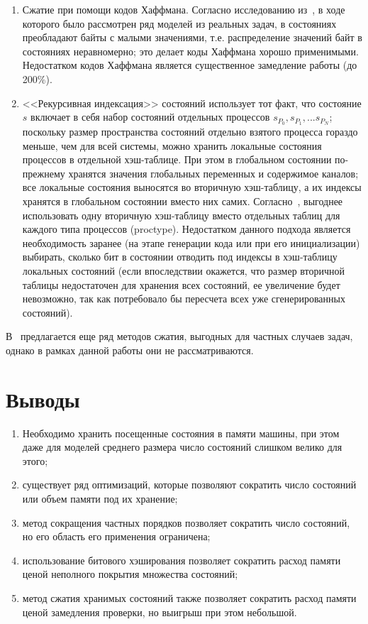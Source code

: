 \begin{enumerate}
\item Сжатие при помощи кодов Хаффмана. Согласно исследованию из~\cite{StateCompr}, в ходе
  которого было рассмотрен ряд моделей из реальных задач, в состояниях преобладают байты с
  малыми значениями, т.е. распределение значений байт в состояниях неравномерно; это
  делает коды Хаффмана хорошо применимыми. Недостатком кодов Хаффмана является
  существенное замедление работы (до 200\%).

\item <<Рекурсивная индексация>> состояний использует тот факт, что состояние $s$ включает
  в себя набор состояний отдельных процессов $s_{P_0}, s_{P_1}, ... s_{P_N}$; поскольку
  размер пространства состояний отдельно взятого процесса гораздо меньше, чем для всей
  системы, можно хранить локальные состояния процессов в отдельной хэш-таблице. При этом в
  глобальном состоянии по-прежнему хранятся значения глобальных переменных и содержимое
  каналов; все локальные состояния выносятся во вторичную хэш-таблицу, а их индексы
  хранятся в глобальном состоянии вместо них самих. Согласно~\cite{StateCompr}, выгоднее
  использовать одну вторичную хэш-таблицу вместо отдельных таблиц для каждого типа
  процессов (proctype). Недостатком данного подхода является необходимость заранее (на
  этапе генерации кода или при его инициализации) выбирать, сколько бит в состоянии
  отводить под индексы в хэш-таблицу локальных состояний (если впоследствии окажется, что
  размер вторичной таблицы недостаточен для хранения всех состояний, ее увеличение будет
  невозможно, так как потребовало бы пересчета всех уже сгенерированных состояний).
\end{enumerate}

В~\cite{StateCompr} предлагается еще ряд методов сжатия, выгодных для частных случаев
задач, однако в рамках данной работы они не рассматриваются.

\section*{Выводы}

\begin{enumerate}
\item Необходимо хранить посещенные состояния в памяти машины, при этом даже для моделей
  среднего размера число состояний слишком велико для этого;
\item существует ряд оптимизаций, которые позволяют сократить число состояний или объем
  памяти под их хранение;
\item метод сокращения частных порядков позволяет сократить число состояний, но его
  область его применения ограничена;
\item использование битового хэширования позволяет сократить расход памяти ценой неполного
  покрытия множества состояний;
\item метод сжатия хранимых состояний также позволяет сократить расход памяти ценой
  замедления проверки, но выигрыш при этом небольшой.
\end{enumerate}


